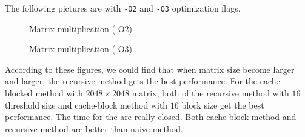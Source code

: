 \documentclass[11pt]{article}
\begin{document}
The following pictures are with \verb|-O2| and \verb|-O3| optimization flags.
\begin{figure}[H]
    \centering
    
    \caption{Matrix multiplication (-O2)}
    \label{fig5:Matrix multiplication (-O2)}
\end{figure}

\begin{figure}[H]
    \centering
    
    \caption{Matrix multiplication (-O3)}
    \label{fig6:Matrix multiplication (-O3)}
\end{figure}

According to these figures, we could find that when matrix size become larger and larger, the recursive method gets the best performance. For the cache-blocked method with $2048 \times 2048$ matrix, both of the recursive method with $16$threshold size and cache-block method with $16$ block size get the best performance. The time for the are really closed. Both cache-block method and recursive method are better than naive method.
\end{document}
